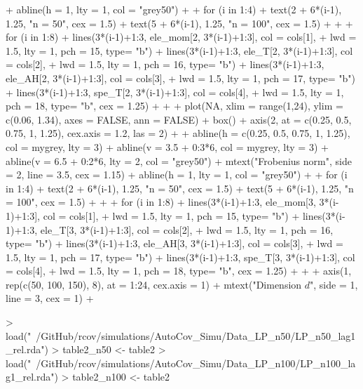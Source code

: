\documentclass{article}
\begin{document}
\begin{Schunk}
\begin{Sinput}
{+   abline(h = 1, lty = 1, col = "grey50")
+ 
+   for (i in 1:4){
+     text(2 + 6*(i-1), 1.25, "n = 50", cex = 1.5)
+     text(5 + 6*(i-1), 1.25, "n = 100", cex = 1.5)
+   }
+ 
+   for (i in 1:8){
+     lines(3*(i-1)+1:3, ele_mom[2, 3*(i-1)+1:3], col = cols[1],
+           lwd = 1.5, lty = 1, pch = 15, type= "b")
+     lines(3*(i-1)+1:3, ele_T[2, 3*(i-1)+1:3], col = cols[2],
+           lwd = 1.5, lty = 1, pch = 16, type= "b")
+     lines(3*(i-1)+1:3, ele_AH[2, 3*(i-1)+1:3], col = cols[3],
+           lwd = 1.5, lty = 1, pch = 17, type= "b")
+     lines(3*(i-1)+1:3, spe_T[2, 3*(i-1)+1:3], col = cols[4],
+           lwd = 1.5, lty = 1, pch = 18, type= "b", cex = 1.25)
+   }
+ 
+   plot(NA, xlim = range(1,24), ylim = c(0.06, 1.34), axes = FALSE, ann = FALSE)
+   box()
+   axis(2, at = c(0.25, 0.5, 0.75, 1, 1.25), cex.axis = 1.2, las = 2)
+ 
+   abline(h = c(0.25, 0.5, 0.75, 1, 1.25), col = mygrey, lty = 3)
+   abline(v = 3.5 + 0:3*6, col = mygrey, lty = 3)
+   abline(v = 6.5 + 0:2*6, lty = 2, col = "grey50")
+   mtext("Frobenius norm", side = 2, line = 3.5, cex = 1.15)
+   abline(h = 1, lty = 1, col = "grey50")
+ 
+   for (i in 1:4){
+     text(2 + 6*(i-1), 1.25, "n = 50", cex = 1.5)
+     text(5 + 6*(i-1), 1.25, "n = 100", cex = 1.5)
+   }
+ 
+   for (i in 1:8){
+     lines(3*(i-1)+1:3, ele_mom[3, 3*(i-1)+1:3], col = cols[1],
+           lwd = 1.5, lty = 1, pch = 15, type= "b")
+     lines(3*(i-1)+1:3, ele_T[3, 3*(i-1)+1:3], col = cols[2],
+           lwd = 1.5, lty = 1, pch = 16, type= "b")
+     lines(3*(i-1)+1:3, ele_AH[3, 3*(i-1)+1:3], col = cols[3],
+           lwd = 1.5, lty = 1, pch = 17, type= "b")
+     lines(3*(i-1)+1:3, spe_T[3, 3*(i-1)+1:3], col = cols[4],
+           lwd = 1.5, lty = 1, pch = 18, type= "b", cex = 1.25)
+   }
+ 
+   axis(1, rep(c(50, 100, 150), 8), at = 1:24, cex.axis = 1)
+   mtext("Dimension $d$", side = 1, line = 3, cex = 1)
+ }
\end{Sinput}
\end{Schunk}

\begin{Schunk}
\begin{Sinput}
> load("~/GitHub/rcov/simulations/AutoCov_Simu/Data_LP_n50/LP_n50_lag1_rel.rda")
> table2_n50 <- table2
> load("~/GitHub/rcov/simulations/AutoCov_Simu/Data_LP_n100/LP_n100_lag1_rel.rda")
> table2_n100 <- table2
\end{Sinput}
\end{Schunk}
\end{document}
